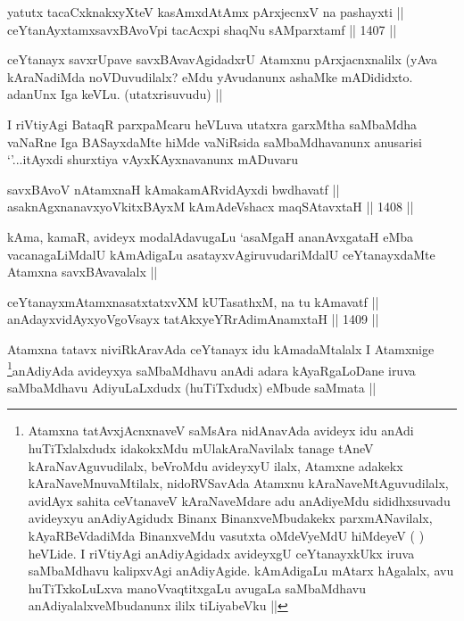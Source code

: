 \begin{shl}
yatutx tacaCxknakxyXteV kasAmxdAtAmx pArxjecnxV na pashayxti || \\
ceYtanAyxtamxsavxBAvoV\s pi tacAcxpi shaqNu sAMparxtamf ||  1407 ||  
\end{shl}

\begin{artha}
ceYtanayx savxrUpave savxBAvavAgidadxrU Atamxnu pArxjacnxnalilx (yAva kAraNadiMda noVDuvudilalx? eMdu yAvudanunx ashaMke mADididxto. adanUnx Iga keVLu. (utatxrisuvudu) ||
\end{artha}

\begin{artha}
I riVtiyAgi BataqR parxpaMcaru heVLuva utatxra garxMtha saMbaMdha vaNaRne Iga BASayxdaMte hiMde vaNiRsida saMbaMdhavanunx anusarisi `\stext'...itAyxdi shurxtiya vAyxKAyxnavanunx mADuvaru
\end{artha}

\begin{shl}
savxBAvoV nA\s \s tamxnaH kAmakamARvidAyxdi bwdhavatf || \\
asaknAgxnanavxyoVkitxBAyxM kAmAdeVshacx maqSAtavxtaH ||  1408 ||  
\end{shl}

\begin{artha}
kAma, kamaR, avideyx modalAdavugaLu `asaMgaH ananAvxgataH eMba vacanagaLiMdalU kAmAdigaLu asatayxvAgiruvudariMdalU ceYtanayxdaMte Atamxna savxBAvavalalx ||
\end{artha}

\begin{shl}
ceYtanayxmAtamxnasatxtatxvXM kUTasathxM, na tu kAmavatf || \\
anAdayxvidAyxyoVgoV\s sayx tatAkxyeYRrAdimAnamxtaH ||  1409 ||  
\end{shl}

\begin{artha}
Atamxna tatavx niviRkAravAda ceYtanayx idu kAmadaMtalalx I Atamxnige \footnote{Atamxna tatAvxjAcnxnaveV saMsAra nidAnavAda avideyx idu anAdi huTiTxlalxdudx idakokxMdu mUlakAraNavilalx tanage tAneV kAraNavAguvudilalx, beVroMdu avideyxyU ilalx, Atamxne adakekx kAraNaveMnuvaMtilalx, nidoRVSavAda Atamxnu kAraNaveMtAguvudilalx, avidAyx sahita ceVtanaveV kAraNaveMdare adu anAdiyeMdu sididhxsuvadu avideyxyu anAdiyAgidudx Binanx BinanxveMbudakekx parxmANavilalx, kAyaRBeVdadiMda BinanxveMdu vasutxta oMdeVyeMdU hiMdeyeV ( ) heVLide. I riVtiyAgi anAdiyAgidadx avideyxgU ceYtanayxkUkx iruva saMbaMdhavu kalipxvAgi anAdiyAgide. kAmAdigaLu mAtarx hAgalalx, avu huTiTxkoLuLxva manoVvaqtitxgaLu avugaLa saMbaMdhavu anAdiyalalxveMbudanunx ililx tiLiyabeVku ||}anAdiyAda avideyxya saMbaMdhavu anAdi adara kAyaRgaLoDane iruva saMbaMdhavu AdiyuLaLxdudx (huTiTxdudx) eMbude saMmata ||
\end{artha}

